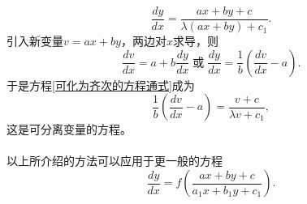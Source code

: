 \begin{equation*}
  \frac{dy}{dx} = \frac{ax+by+c}{\lambda(ax+by)+c_1}.
\end{equation*}
引入新变量$v=ax+by$，两边对$x$求导，则
\begin{equation*}
  \frac{dv}{dx} = a + b\frac{dy}{dx} \;\text{或}\; \frac{dy}{dx} = \frac{1}{b}(\frac{dv}{dx} - a).
\end{equation*}
于是方程\eqref{可化为齐次的方程通式}成为
\begin{equation*}
  \frac{1}{b}(\frac{dv}{dx} - a) = \frac{v+c}{\lambda v + c_1},
\end{equation*}
这是可分离变量的方程。

\paragraph{}
以上所介绍的方法可以应用于更一般的方程
\begin{equation*}
  \frac{dy}{dx} = f(\frac{ax+by+c}{a_1x+b_1y+c_1}).
\end{equation*}
